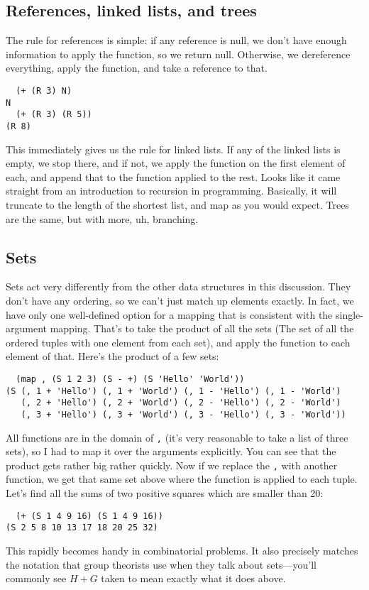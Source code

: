 \documentclass{article}
\newcommand{\code}[1]{\lstinline`#1`}
\begin{document}
\subsection{References, linked lists, and trees}
The rule for references is simple: if any reference is null, we don't have enough information to apply the function, so we return null. Otherwise, we dereference everything, apply the function, and take a reference to that.
\begin{lstlisting}
  (+ (R 3) N)
N
  (+ (R 3) (R 5))
(R 8)
\end{lstlisting}
This immediately gives us the rule for linked lists. If any of the linked lists is empty, we stop there, and if not, we apply the function on the first element of each, and append that to the function applied to the rest. Looks like it came straight from an introduction to recursion in programming. Basically, it will truncate to the length of the shortest list, and map as you would expect. Trees are the same, but with more, uh, branching.

\subsection{Sets}
Sets act very differently from the other data structures in this discussion. They don't have any ordering, so we can't just match up elements exactly. In fact, we have only one well-defined option for a mapping that is consistent with the single-argument mapping. That's to take the product of all the sets (The set of all the ordered tuples with one element from each set), and apply the function to each element of that. Here's the product of a few sets:
\begin{lstlisting}
  (map , (S 1 2 3) (S - +) (S 'Hello' 'World'))
(S (, 1 + 'Hello') (, 1 + 'World') (, 1 - 'Hello') (, 1 - 'World')
   (, 2 + 'Hello') (, 2 + 'World') (, 2 - 'Hello') (, 2 - 'World')
   (, 3 + 'Hello') (, 3 + 'World') (, 3 - 'Hello') (, 3 - 'World'))
\end{lstlisting}
All functions are in the domain of \code{,} (it's very reasonable to take a list of three sets), so I had to map it over the arguments explicitly. You can see that the product gets rather big rather quickly. Now if we replace the \code{,} with another function, we get that same set above where the function is applied to each tuple. Let's find all the sums of two positive squares which are smaller than 20:
\begin{lstlisting}
  (+ (S 1 4 9 16) (S 1 4 9 16))
(S 2 5 8 10 13 17 18 20 25 32)
\end{lstlisting}
This rapidly becomes handy in combinatorial problems. It also precisely matches the notation that group theorists use when they talk about sets---you'll commonly see $H+G$ taken to mean exactly what it does above.
\end{document}
